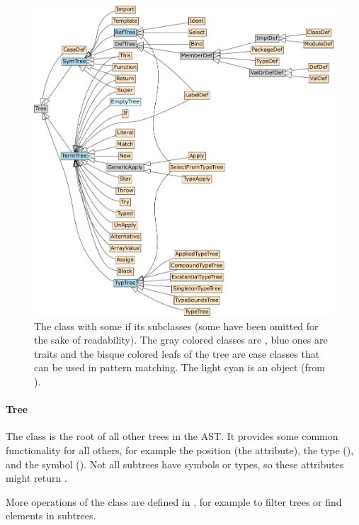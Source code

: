 \begin{figure}
 \centering
 \includegraphics[width=\linewidth]{trees-class-diagram.pdf}
 \caption{The  class with some if its subclasses (some have been omitted for the sake of readability). The gray colored classes are , blue ones are traits and the bisque colored leafs of the tree are case classes that can be used in pattern matching. The light cyan  is an object (from \cite{ScalaRefactoring}).}
 \label{figure:trees-class-diagram}
\end{figure}

\paragraph{Tree} \hfill \newline

\noindent The  class is the root of all other trees in the AST. It provides some common functionality for all others, for example the position (the  attribute), the type (), and the symbol (). Not all subtrees have symbols or types, so these attributes might return .

More operations of the  class are defined in , for example to filter trees or find elements in subtrees.

